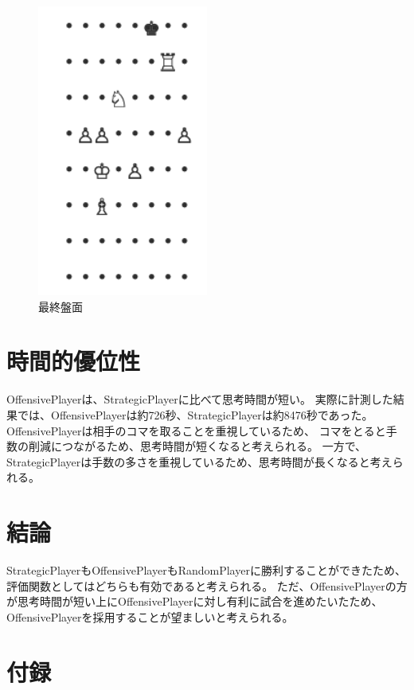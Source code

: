 \documentclass[12pt, a4paper, uplatex]{jsarticle}
\begin{document}
\begin{figure}
  [h]
  \centering
  \includegraphics[width=0.5\textwidth]{Finally.png}
  \caption{最終盤面}\label{fig:finally}
\end{figure}

\section{時間的優位性}
OffensivePlayerは、StrategicPlayerに比べて思考時間が短い。
実際に計測した結果では、OffensivePlayerは約726秒、StrategicPlayerは約8476秒であった。
OffensivePlayerは相手のコマを取ることを重視しているため、
コマをとると手数の削減につながるため、思考時間が短くなると考えられる。
一方で、StrategicPlayerは手数の多さを重視しているため、思考時間が長くなると考えられる。

\section{結論}
StrategicPlayerもOffensivePlayerもRandomPlayerに勝利することができたため、
評価関数としてはどちらも有効であると考えられる。
ただ、OffensivePlayerの方が思考時間が短い上にOffensivePlayerに対し有利に試合を進めたいたため、
OffensivePlayerを採用することが望ましいと考えられる。

\section{付録}
\end{document}
